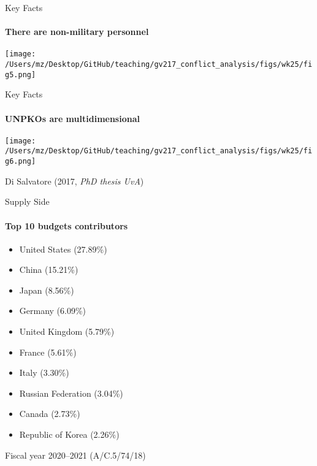 \documentclass[handout]{beamer}
\begin{document}
\begin{frame}{Key Facts}
\framesubtitle{There are non-military personnel}
    \pause
    \begin{center}
        \texttt{[image: /Users/mz/Desktop/GitHub/teaching/gv217\_conflict\_analysis/figs/wk25/fig5.png]}
    \end{center}
\end{frame}

\begin{frame}{Key Facts}
    \framesubtitle{UNPKOs are multidimensional}
    \pause
    \begin{center}
        \texttt{[image: /Users/mz/Desktop/GitHub/teaching/gv217\_conflict\_analysis/figs/wk25/fig6.png]}
    \end{center}
    \tiny Di Salvatore (2017, \textit{PhD thesis UvA})
\end{frame}    

\begin{frame}{Supply Side}
\framesubtitle{Top 10 budgets contributors}
\begin{itemize}
    \pause\item {} United States (27.89\%)
    \pause\item {} China (15.21\%)
    \pause\item {} Japan (8.56\%)
    \pause\item {} Germany (6.09\%)
    \pause\item {} United Kingdom (5.79\%)
    \pause\item {} France (5.61\%)
    \pause\item {} Italy (3.30\%)
    \pause\item {} Russian Federation (3.04\%)
    \pause\item {} Canada (2.73\%)
    \pause\item {} Republic of Korea (2.26\%)
\end{itemize}
\tiny Fiscal year 2020--2021 (A/C.5/74/18)
\end{frame}
\end{document}
